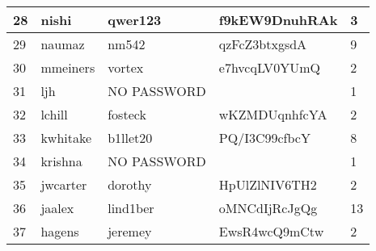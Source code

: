 \documentclass[11pt]{article} %
\begin{document}
\begin{tabular}{|p{0.5cm}|p{3.1cm}|p{3.1cm}|p{3.3cm}|p{1.7cm}|}
28 & nishi & qwer123 & f9kEW9DnuhRAk & 3 \\ \hline
29 & naumaz & nm542 & qzFcZ3btxgsdA & 9 \\ \hline
30 & mmeiners & vortex & e7hvcqLV0YUmQ & 2\\ \hline
31 & ljh & NO PASSWORD & & 1\\ \hline
32 & lchill & fosteck & wKZMDUqnhfcYA & 2\\ \hline
33 & kwhitake & b1llet20 & PQ/I3C99cfbcY & 8 \\ \hline
34 & krishna & NO PASSWORD & & 1\\ \hline
35 & jwcarter & dorothy & HpUlZlNIV6TH2 & 2\\ \hline
36 & jaalex & lind1ber & oMNCdIjRcJgQg & 13 \\ \hline
37 & hagens & jeremey & EwsR4wcQ9mCtw & 2\\ \hline
\end{tabular}
\end{document}
